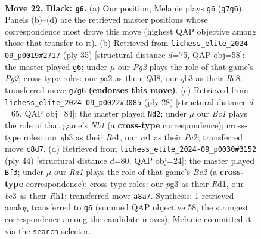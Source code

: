 \documentclass[11pt]{article}
\begin{document}
\clearpage

\begin{figure}[p]\centering
\begin{subfigure}{0.46\textwidth}\centering
\resizebox{\linewidth}{!}{%
\newchessgame
\chessboard[
  setfen={rnb1q1k1/1p4pp/4r3/p3Np2/8/1QB1P1P1/P4P1P/1R2R1K1 b - - 2 22},
  showmover=false,
  pgfstyle=straightmove, color=movearrow, markmove={g7-g6}
]}
\caption{}
\end{subfigure}\hfill
\begin{subfigure}{0.46\textwidth}\centering
\resizebox{\linewidth}{!}{%
\newchessgame
\chessboard[
  setfen={1r1qr1k1/pb3ppp/3b4/2p5/4B3/1P3N1P/P1Q2PP1/R3R1K1 b - - 0 18},
  showmover=false,
  pgfstyle=straightmove, color=movearrow, markmove={g7-g6}
]}
\caption{}
\end{subfigure}
\\[4pt]
\begin{subfigure}{0.46\textwidth}\centering
\resizebox{\linewidth}{!}{%
\newchessgame
\chessboard[
  setfen={r2qr3/pbp2pkp/1p4p1/8/4n3/3B3P/PPP2PP1/RN1QR1K1 w - - 0 15},
  showmover=false,
  pgfstyle=straightmove, color=movearrow, markmove={b1-d2}
]}
\caption{}
\end{subfigure}\hfill
\begin{subfigure}{0.46\textwidth}\centering
\resizebox{\linewidth}{!}{%
\newchessgame
\chessboard[
  setfen={3r1rk1/1p1b3p/1Pq1pp2/p7/4NP1P/b1P1Q3/4B1P1/3RK2R w K - 1 23},
  showmover=false,
  pgfstyle=straightmove, color=movearrow, markmove={e2-f3}
]}
\caption{}
\end{subfigure}
\caption{\textbf{Move 22, Black: \texttt{g6}.} (a) Our position; Melanie plays \texttt{g6} (\texttt{g7g6}). Panels (b)--(d) are the retrieved master positions whose correspondence most drove this move (highest QAP objective among those that transfer to it). (b) Retrieved from \texttt{lichess\_elite\_2024-09\_p0019\#2717} (ply 35) [structural distance $d$=75, QAP obj=58]: the master played \texttt{g6}; under $\mu$ our \emph{Pg2} plays the role of that game's \emph{Pg2}; cross-type roles: our \emph{p}a2 as their \emph{Q}d8, our \emph{q}b3 as their \emph{R}e8; transferred move \texttt{g7g6} \textbf{(endorses this move)}. (c) Retrieved from \texttt{lichess\_elite\_2024-09\_p0022\#3085} (ply 28) [structural distance $d$=65, QAP obj=84]: the master played \texttt{Nd2}; under $\mu$ our \emph{Bc1} plays the role of that game's \emph{Nb1} (a \textbf{cross-type} correspondence); cross-type roles: our \emph{q}b3 as their \emph{R}e1, our \emph{r}e1 as their \emph{P}c2; transferred move \texttt{c8d7}. (d) Retrieved from \texttt{lichess\_elite\_2024-09\_p0030\#3152} (ply 44) [structural distance $d$=80, QAP obj=24]: the master played \texttt{Bf3}; under $\mu$ our \emph{Ra1} plays the role of that game's \emph{Be2} (a \textbf{cross-type} correspondence); cross-type roles: our \emph{p}g3 as their \emph{R}d1, our \emph{b}c3 as their \emph{R}h1; transferred move \texttt{a8a7}. Synthesis: 1 retrieved analog transferred to \texttt{g6} (summed QAP objective 58, the strongest correspondence among the candidate moves); Melanie committed it via the \texttt{search} selector.}
\label{fig:thought-m43}
\end{figure}
\end{document}
